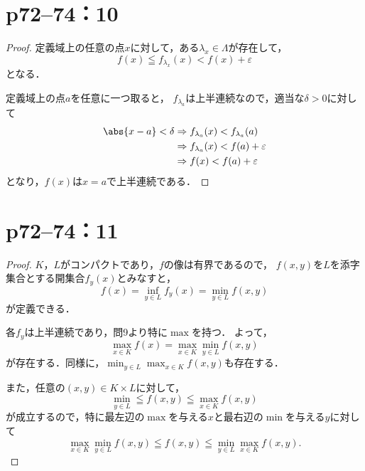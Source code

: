 \section*{p72--74：10}

\begin{tleftbar}
    \begin{proof}
        定義域上の任意の点$x$に対して，ある$ \lambda_x \in \Lambda$が存在して，
        \[
            f(x) \leqq f_{\lambda_x} (x) < f(x) + \varepsilon
        \]
        となる．

        定義域上の点$a$を任意に一つ取ると，
        $f_{\lambda_a}$は上半連続なので，適当な$\delta >0$に対して
        \begin{align*}
            \abs{x-a}<\delta & \Rightarrow f_{\lambda_a}(x) < f_{\lambda_a}(a)     \\
                             & \Rightarrow  f_{\lambda_a}(x) < f (a) + \varepsilon \\
                             & \Rightarrow f(x) < f(a) + \varepsilon
        \end{align*}
        となり，$f(x)$は$x=a$で上半連続である．
    \end{proof}
\end{tleftbar}


\section*{p72--74：11}

\begin{tleftbar}
    \begin{proof}
        $K$，$L$がコンパクトであり，$f$の像は有界であるので，
        $f(x,y)$を$L$を添字集合とする開集合$f_y (x)$とみなすと，
        \[
            f(x) =\inf_{y \in L} f_y (x)=\min_{y \in L} f(x,y)
        \]
        が定義できる．

        各$f_y$は上半連続であり，問9より特に$\max $を持つ．
        よって，
        \[
            \max_{x \in K} f(x) = \max_{x \in K} \min_{y \in L} f(x,y)
        \]
        が存在する．同様に，$\min_{y \in L} \max_{x \in K} f(x,y)$も存在する．

        また，任意の$(x,y) \in K \times L$に対して，
        \[
            \min_{y \in L} \leqq f(x,y) \leqq \max_{x \in K} f(x,y)
        \]
        が成立するので，特に最左辺の$\max$を与える$x$と最右辺の$\min$を与える$y$に対して
        \[
            \max_{x \in K} \min_{y \in L} f(x,y) \leqq f(x,y) \leqq \min_{y \in L} \max_{x \in K} f(x,y).
        \]
    \end{proof}
\end{tleftbar}

